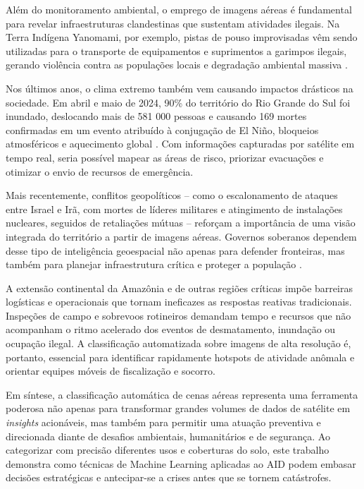 \documentclass[conference]{IEEEtran}
\begin{document}
    Além do monitoramento ambiental, o emprego de imagens aéreas é fundamental para revelar infraestruturas clandestinas que sustentam atividades ilegais. Na Terra Indígena Yanomami, por exemplo, pistas de pouso improvisadas vêm sendo utilizadas para o transporte de equipamentos e suprimentos a garimpos ilegais, gerando violência contra as populações locais e degradação ambiental massiva \cite{bastos2024}.

    Nos últimos anos, o clima extremo também vem causando impactos drásticos na sociedade. Em abril e maio de 2024, 90\% do território do Rio Grande do Sul foi inundado, deslocando mais de 581 000 pessoas e causando 169 mortes confirmadas em um evento atribuído à conjugação de El Niño, bloqueios atmosféricos e aquecimento global \cite{fearnside2024}. Com informações capturadas por satélite em tempo real, seria possível mapear as áreas de risco, priorizar evacuações e otimizar o envio de recursos de emergência.

    Mais recentemente, conflitos geopolíticos – como o escalonamento de ataques entre Israel e Irã, com mortes de líderes militares e atingimento de instalações nucleares, seguidos de retaliações mútuas – reforçam a importância de uma visão integrada do território a partir de imagens aéreas. Governos soberanos dependem desse tipo de inteligência geoespacial não apenas para defender fronteiras, mas também para planejar infraestrutura crítica e proteger a população \cite{g1_2025_israel_x_ira,g1_2025_israel_ataque_ira,bbc2025_eua_ataque_tehera,bbc2025_ira_retalia}.

    A extensão continental da Amazônia e de outras regiões críticas impõe barreiras logísticas e operacionais que tornam ineficazes as respostas reativas tradicionais. Inspeções de campo e sobrevoos rotineiros demandam tempo e recursos que não acompanham o ritmo acelerado dos eventos de desmatamento, inundação ou ocupação ilegal. A classificação automatizada sobre imagens de alta resolução é, portanto, essencial para identificar rapidamente hotspots de atividade anômala e orientar equipes móveis de fiscalização e socorro.
    
    Em síntese, a classificação automática de cenas aéreas representa uma ferramenta poderosa não apenas para transformar grandes volumes de dados de satélite em \textit{insights} acionáveis, mas também para permitir uma atuação preventiva e direcionada diante de desafios ambientais, humanitários e de segurança. Ao categorizar com precisão diferentes usos e coberturas do solo, este trabalho demonstra como técnicas de Machine Learning aplicadas ao AID podem embasar decisões estratégicas e antecipar-se a crises antes que se tornem catástrofes.
\end{document}
